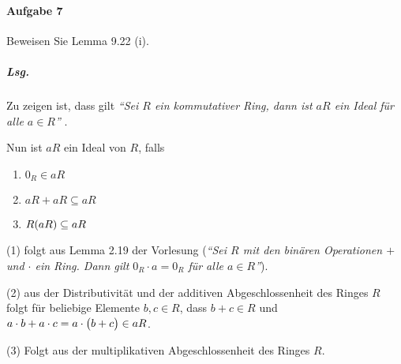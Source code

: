 \documentclass{scrreprt}
\begin{document}
\paragraph{Aufgabe 7} Beweisen Sie Lemma 9.22 (i).

\subparagraph{Lsg.} Zu zeigen ist, dass gilt
\emph{
  ``Sei $R$ ein kommutativer Ring, dann ist $aR$ ein Ideal für alle $a \in R$''
}.

Nun ist $aR$ ein Ideal von $R$, falls
\begin{enumerate}[(1)]
\item $0_R \in aR$
\item $aR + aR \subseteq aR$
\item $R\qty(aR) \subseteq aR$
\end{enumerate}
(1) folgt aus Lemma 2.19 der Vorlesung (\emph{``Sei $R$ mit den binären
  Operationen $+$ und $\cdot$ ein Ring.
  Dann gilt $0_R \cdot a = 0_R$ für alle $a \in R$''}).

\noindent
(2) aus der Distributivität und der additiven
Abgeschlossenheit des Ringes $R$ folgt für beliebige Elemente $b, c \in R$,
dass $b + c \in R$ und $a \cdot b + a \cdot c = a \cdot \qty\big(b + c) \in aR$.

\noindent
(3) Folgt aus der multiplikativen Abgeschlossenheit des Ringes $R$.
\end{document}
